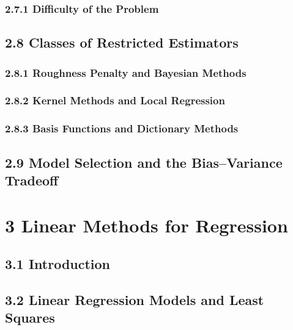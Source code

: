 \documentclass[11pt]{article}
\begin{document}
\subsubsection{2.7.1 Difficulty of the
Problem}\label{difficulty-of-the-problem}

\subsection{2.8 Classes of Restricted
Estimators}\label{classes-of-restricted-estimators}

\subsubsection{2.8.1 Roughness Penalty and Bayesian
Methods}\label{roughness-penalty-and-bayesian-methods}

\subsubsection{2.8.2 Kernel Methods and Local
Regression}\label{kernel-methods-and-local-regression}

\subsubsection{2.8.3 Basis Functions and Dictionary
Methods}\label{basis-functions-and-dictionary-methods}

\subsection{2.9 Model Selection and the Bias--Variance
Tradeoff}\label{model-selection-and-the-biasvariance-tradeoff}

    \section{3 Linear Methods for
Regression}\label{linear-methods-for-regression}

\subsection{3.1 Introduction}\label{introduction}

\subsection{3.2 Linear Regression Models and Least
Squares}\label{linear-regression-models-and-least-squares}
\end{document}
